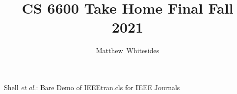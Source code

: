\documentclass[journal,onecolumn]{IEEEtran}
\begin{document}
%
\title{CS 6600 Take Home Final Fall 2021}

%
%
%
\author{Matthew~Whitesides}%

%
{Shell \MakeLowercase{\textit{et al.}}: Bare Demo of IEEEtran.cls for IEEE Journals}

\maketitle


\IEEEpeerreviewmaketitle
\end{document}
